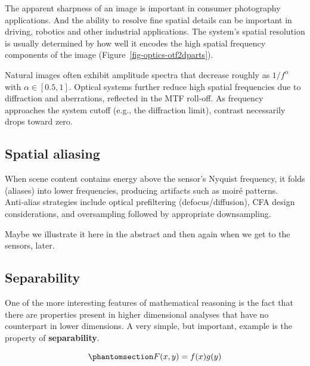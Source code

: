 \documentclass[
  letterpaper,
]{book}
\begin{document}
The apparent sharpness of an image is important in consumer photography
applications. And the ability to resolve fine spatial details can be
important in driving, robotics and other industrial applications. The
system's spatial resolution is usually determined by how well it encodes
the high spatial frequency components of the image
(Figure~\ref{fig-optics-otf2dparts}).

Natural images often exhibit amplitude spectra that decrease roughly as
\(1/f^{\alpha}\) with \(\alpha\in[0.5,1]\). Optical systems further
reduce high spatial frequencies due to diffraction and aberrations,
reflected in the MTF roll‑off. As frequency approaches the system cutoff
(e.g., the diffraction limit), contrast necessarily drops toward zero.

\subsection{Spatial aliasing}\label{spatial-aliasing}

When scene content contains energy above the sensor's Nyquist frequency,
it folds (aliases) into lower frequencies, producing artifacts such as
moiré patterns. Anti‑alias strategies include optical prefiltering
(defocus/diffusion), CFA design considerations, and oversampling
followed by appropriate downsampling.

Maybe we illustrate it here in the abstract and then again when we get
to the sensors, later.

\subsection{Separability}\label{separability}

One of the more interesting features of mathematical reasoning is the
fact that there are properties present in higher dimensional analyses
that have no counterpart in lower dimensions. A very simple, but
important, example is the property of \textbf{separability}.

\begin{equation}\phantomsection\label{eq-separability-definition}{
F(x,y) = f(x) g(y)
}\end{equation}
\end{document}
